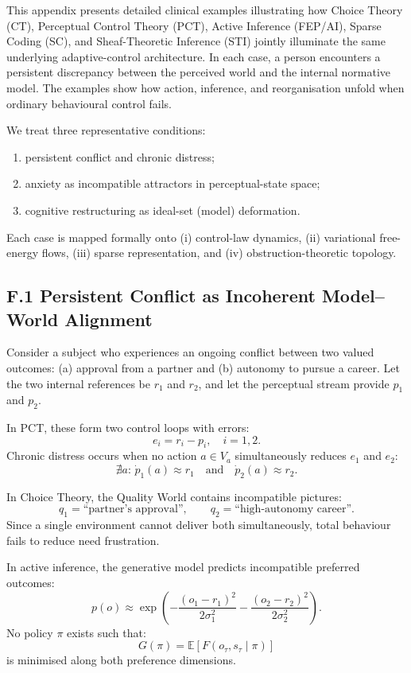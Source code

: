 \documentclass[11pt,a4paper,twoside]{article}
\begin{document}
This appendix presents detailed clinical examples illustrating how Choice Theory (CT), Perceptual Control Theory (PCT), Active Inference (FEP/AI), Sparse Coding (SC), and Sheaf-Theoretic Inference (STI) jointly illuminate the same underlying adaptive-control architecture. In each case, a person encounters a persistent discrepancy between the perceived world and the internal normative model. The examples show how action, inference, and reorganisation unfold when ordinary behavioural control fails.

We treat three representative conditions:
\begin{enumerate}
    \item persistent conflict and chronic distress;
    \item anxiety as incompatible attractors in perceptual-state space;
    \item cognitive restructuring as ideal-set (model) deformation.
\end{enumerate}

Each case is mapped formally onto (i) control-law dynamics, (ii) variational free-energy flows, (iii) sparse representation, and (iv) obstruction-theoretic topology.

\subsection*{F.1 Persistent Conflict as Incoherent Model–World Alignment}

Consider a subject who experiences an ongoing conflict between two valued outcomes: (a) approval from a partner and (b) autonomy to pursue a career. Let the two internal references be $r_1$ and $r_2$, and let the perceptual stream provide $p_1$ and $p_2$.

In PCT, these form two control loops with errors:
\[
e_i = r_i - p_i, \quad i=1,2.
\]
Chronic distress occurs when no action $a \in V_{\!a}$ simultaneously reduces $e_1$ and $e_2$:
\[
\nexists a: \, \dot{p}_1(a) \approx r_1 \quad \text{and} \quad \dot{p}_2(a) \approx r_2.
\]

In Choice Theory, the Quality World contains incompatible pictures:
\[
q_1 = \text{``partner’s approval''}, \qquad q_2 = \text{``high-autonomy career''}.
\]
Since a single environment cannot deliver both simultaneously, total behaviour fails to reduce need frustration.

In active inference, the generative model predicts incompatible preferred outcomes:
\[
p(o) \approx \exp \left( -\frac{(o_1 - r_1)^2}{2\sigma_1^2} - \frac{(o_2 - r_2)^2}{2\sigma_2^2} \right).
\]
No policy $\pi$ exists such that:
\[
G(\pi) = \mathbb{E}[F(o_\tau,s_\tau \mid \pi)]
\]
is minimised along both preference dimensions.
\end{document}
